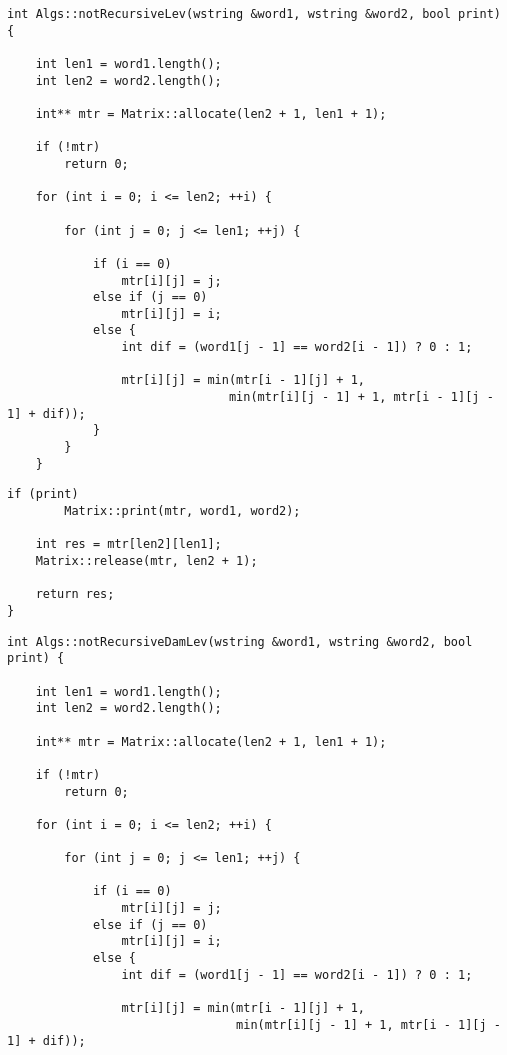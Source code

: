 \begin{lstlisting}[label=lst:lev_mtr,caption=Функция нахождения расстояния Левенштейна с использованием матрицы (начало)]
int Algs::notRecursiveLev(wstring &word1, wstring &word2, bool print) {
    
    int len1 = word1.length();
    int len2 = word2.length();

    int** mtr = Matrix::allocate(len2 + 1, len1 + 1);

    if (!mtr)
        return 0;

    for (int i = 0; i <= len2; ++i) {

        for (int j = 0; j <= len1; ++j) {

            if (i == 0)
                mtr[i][j] = j;
            else if (j == 0)
                mtr[i][j] = i;
            else {
                int dif = (word1[j - 1] == word2[i - 1]) ? 0 : 1;

                mtr[i][j] = min(mtr[i - 1][j] + 1, 
                               min(mtr[i][j - 1] + 1, mtr[i - 1][j - 1] + dif));
            }
        }
    }
\end{lstlisting}

\begin{lstlisting}[label=lst:lev_mtr,caption=Функция нахождения расстояния Левенштейна с использованием матрицы (конец)]
    if (print)  
        Matrix::print(mtr, word1, word2);

    int res = mtr[len2][len1];
    Matrix::release(mtr, len2 + 1);

    return res;
}
\end{lstlisting}

\begin{lstlisting}[label=lst:dameray_lev_rec,caption=Функция нахождения расстояния Дамерау\,--\,Левенштейна с использованием матрицы (начало)]
int Algs::notRecursiveDamLev(wstring &word1, wstring &word2, bool print) {

    int len1 = word1.length();
    int len2 = word2.length();

    int** mtr = Matrix::allocate(len2 + 1, len1 + 1);

    if (!mtr)
        return 0;

    for (int i = 0; i <= len2; ++i) {

        for (int j = 0; j <= len1; ++j) {

            if (i == 0)
                mtr[i][j] = j;
            else if (j == 0)
                mtr[i][j] = i;
            else {
                int dif = (word1[j - 1] == word2[i - 1]) ? 0 : 1;

                mtr[i][j] = min(mtr[i - 1][j] + 1, 
                                min(mtr[i][j - 1] + 1, mtr[i - 1][j - 1] + dif));
\end{lstlisting}

